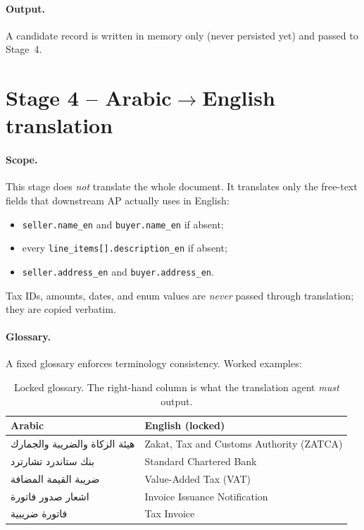 \documentclass[11pt,a4paper,twoside]{report}
\newcommand{\ar}[1]{#1}
\begin{document}
\paragraph{Output.} A candidate record is written in memory only (never
persisted yet) and passed to Stage~4.

\section{Stage 4 -- Arabic$\to$English translation}

\paragraph{Scope.} This stage does \emph{not} translate the whole
document. It translates only the free-text fields that downstream AP
actually uses in English:

\begin{itemize}
  \item \texttt{seller.name\_en} and \texttt{buyer.name\_en} if absent;
  \item every \texttt{line\_items[].description\_en} if absent;
  \item \texttt{seller.address\_en} and \texttt{buyer.address\_en}.
\end{itemize}

Tax IDs, amounts, dates, and enum values are \emph{never} passed through
translation; they are copied verbatim.

\paragraph{Glossary.} A fixed glossary enforces terminology consistency.
Worked examples:

\begin{table}[htbp]
\centering
\caption{Locked glossary. The right-hand column is what the translation
         agent \emph{must} output.}
\label{tab:glossary}
\small
\begin{tabularx}{\linewidth}{@{}X X@{}}
\toprule
\textbf{Arabic} & \textbf{English (locked)} \\ \midrule
\ar{هيئة الزكاة والضريبة والجمارك} & Zakat, Tax and Customs Authority (ZATCA) \\
\ar{بنك ستاندرد تشارترد}           & Standard Chartered Bank \\
\ar{ضريبة القيمة المضافة}           & Value-Added Tax (VAT) \\
\ar{اشعار صدور فاتورة}              & Invoice Issuance Notification \\
\ar{فاتورة ضريبية}                  & Tax Invoice \\
\bottomrule
\end{tabularx}
\end{table}
\end{document}

